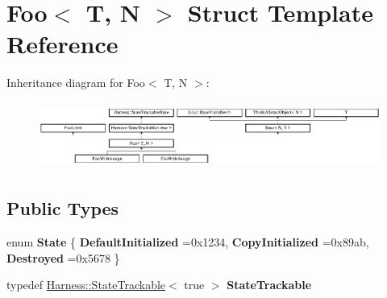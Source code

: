 \hypertarget{structFoo}{}\section{Foo$<$ T, N $>$ Struct Template Reference}
\label{structFoo}
Inheritance diagram for Foo$<$ T, N $>$\+:\begin{figure}[H]
\begin{center}
\leavevmode
\includegraphics[height=2.206897cm]{structFoo}
\end{center}
\end{figure}
\subsection*{Public Types}
\begin{DoxyCompactItemize}
\item 
\hypertarget{structFoo_ac121be572d3076179590fb114e53a748}{}enum {\bfseries State} \{ {\bfseries Default\+Initialized} =0x1234, 
{\bfseries Copy\+Initialized} =0x89ab, 
{\bfseries Destroyed} =0x5678
 \}\label{structFoo_ac121be572d3076179590fb114e53a748}

\item 
\hypertarget{structFoo_ad4b92b1006763962cdf11ea8320a71ce}{}typedef \hyperlink{structHarness_1_1StateTrackable}{Harness\+::\+State\+Trackable}$<$ true $>$ {\bfseries State\+Trackable}\label{structFoo_ad4b92b1006763962cdf11ea8320a71ce}

\end{DoxyCompactItemize}
